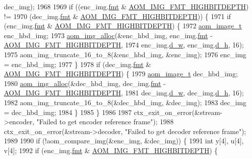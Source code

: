 \begin{DoxyCodeInclude}
{{{{{{{{{{{{{{{{{{{{{{{{{{{{{{{{{{{{{{{{{{{{      dec\_img);
1968 
1969   \textcolor{keywordflow}{if} ((enc\_img.\hyperlink{structaom__image_a6c64b1ab918d80d52eb8f5d6d957e825}{fmt} & \hyperlink{aom__image_8h_a607b37d91f75442f54223ecd85f1b6cb}{AOM\_IMG\_FMT\_HIGHBITDEPTH}) !=
1970       (dec\_img.\hyperlink{structaom__image_a6c64b1ab918d80d52eb8f5d6d957e825}{fmt} & \hyperlink{aom__image_8h_a607b37d91f75442f54223ecd85f1b6cb}{AOM\_IMG\_FMT\_HIGHBITDEPTH})) \{
1971     \textcolor{keywordflow}{if} (enc\_img.\hyperlink{structaom__image_a6c64b1ab918d80d52eb8f5d6d957e825}{fmt} & \hyperlink{aom__image_8h_a607b37d91f75442f54223ecd85f1b6cb}{AOM\_IMG\_FMT\_HIGHBITDEPTH}) \{
1972       \hyperlink{structaom__image}{aom\_image\_t} enc\_hbd\_img;
1973       \hyperlink{aom__image_8h_a570db29fbd122951235a08fe9375f6bb}{aom\_img\_alloc}(&enc\_hbd\_img, enc\_img.\hyperlink{structaom__image_a6c64b1ab918d80d52eb8f5d6d957e825}{fmt} - 
      \hyperlink{aom__image_8h_a607b37d91f75442f54223ecd85f1b6cb}{AOM\_IMG\_FMT\_HIGHBITDEPTH},
1974                     enc\_img.\hyperlink{structaom__image_a89f80b1f58d608b9d2080635f4359034}{d\_w}, enc\_img.\hyperlink{structaom__image_ab986419a1f0fff93a2dc505f47194988}{d\_h}, 16);
1975       aom\_img\_truncate\_16\_to\_8(&enc\_hbd\_img, &enc\_img);
1976       enc\_img = enc\_hbd\_img;
1977     \}
1978     \textcolor{keywordflow}{if} (dec\_img.\hyperlink{structaom__image_a6c64b1ab918d80d52eb8f5d6d957e825}{fmt} & \hyperlink{aom__image_8h_a607b37d91f75442f54223ecd85f1b6cb}{AOM\_IMG\_FMT\_HIGHBITDEPTH}) \{
1979       \hyperlink{structaom__image}{aom\_image\_t} dec\_hbd\_img;
1980       \hyperlink{aom__image_8h_a570db29fbd122951235a08fe9375f6bb}{aom\_img\_alloc}(&dec\_hbd\_img, dec\_img.\hyperlink{structaom__image_a6c64b1ab918d80d52eb8f5d6d957e825}{fmt} - 
      \hyperlink{aom__image_8h_a607b37d91f75442f54223ecd85f1b6cb}{AOM\_IMG\_FMT\_HIGHBITDEPTH},
1981                     dec\_img.\hyperlink{structaom__image_a89f80b1f58d608b9d2080635f4359034}{d\_w}, dec\_img.\hyperlink{structaom__image_ab986419a1f0fff93a2dc505f47194988}{d\_h}, 16);
1982       aom\_img\_truncate\_16\_to\_8(&dec\_hbd\_img, &dec\_img);
1983       dec\_img = dec\_hbd\_img;
1984     \}
1985   \}
1986 
1987   ctx\_exit\_on\_error(&stream->encoder, \textcolor{stringliteral}{"Failed to get encoder reference frame"});
1988   ctx\_exit\_on\_error(&stream->decoder, \textcolor{stringliteral}{"Failed to get decoder reference frame"});
1989 
1990   \textcolor{keywordflow}{if} (!aom\_compare\_img(&enc\_img, &dec\_img)) \{
1991     \textcolor{keywordtype}{int} y[4], u[4], v[4];
1992     \textcolor{keywordflow}{if} (enc\_img.\hyperlink{structaom__image_a6c64b1ab918d80d52eb8f5d6d957e825}{fmt} & \hyperlink{aom__image_8h_a607b37d91f75442f54223ecd85f1b6cb}{AOM\_IMG\_FMT\_HIGHBITDEPTH}) \{
}}}}}}}}}}}}}}}}}}}}}}}}}}}}}}}}}}}}}}}}}}}}
\end{DoxyCodeInclude}
